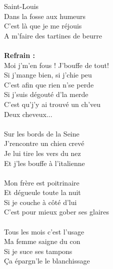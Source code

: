  Saint-Louis
\\Dans la fosse aux humeurs
\\C'est là que je me réjouis
\\A m'faire des tartines de beurre
\\\\\textbf{Refrain :}
\\Moi j'm'en fous ! J'bouffe de tout!
\\Si j'mange bien, si j'chie peu
\\C'est afin que rien n'se perde
\\Si j'suis dégouté d'la merde
\\C'est qu'j'y ai trouvé un ch'veu
\\Deux cheveux...
\\\\Sur les bords de la Seine
\\J'rencontre un chien crevé
\\Je lui tire les vers du nez
\\Et j'les bouffe à l'italienne
\\\\Mon frère est poitrinaire
\\Et dégueule toute la nuit
\\Si je couche à côté d'lui
\\C'est pour mieux gober ses glaires
\\\\Tous les mois c'est l'usage
\\Ma femme saigne du con
\\Si je suce ses tampons
\\Ça épargn'le le blanchissage
\breakpage
